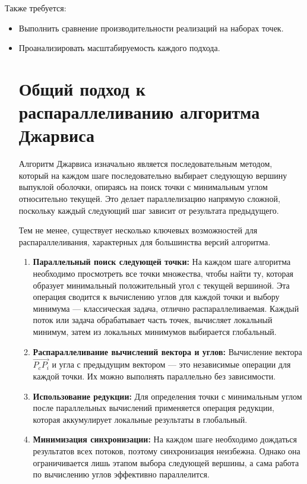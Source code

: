 \documentclass[a4paper,12pt]{article}
\begin{document}
Также требуется:
\begin{itemize}
    \item Выполнить сравнение производительности реализаций на наборах точек.
    \item Проанализировать масштабируемость каждого подхода.
\newpage
\section{Общий подход к распараллеливанию алгоритма Джарвиса}

Алгоритм Джарвиса изначально является последовательным методом, который на каждом шаге последовательно выбирает следующую вершину выпуклой оболочки, опираясь на поиск точки с минимальным углом относительно текущей. Это делает параллелизацию напрямую сложной, поскольку каждый следующий шаг зависит от результата предыдущего.

Тем не менее, существует несколько ключевых возможностей для распараллеливания, характерных для большинства версий алгоритма.

\begin{enumerate}
    \item \textbf{Параллельный поиск следующей точки:}  
    На каждом шаге алгоритма необходимо просмотреть все точки множества, чтобы найти ту, которая образует минимальный положительный угол с текущей вершиной. Эта операция сводится к вычислению углов для каждой точки и выбору минимума — классическая задача, отлично распараллеливаемая.  
    Каждый поток или задача обрабатывает часть точек, вычисляет локальный минимум, затем из локальных минимумов выбирается глобальный.

    \item \textbf{Распараллеливание вычислений вектора и углов:}  
    Вычисление вектора $\overrightarrow{P_c P_i}$ и угла с предыдущим вектором — это независимые операции для каждой точки. Их можно выполнять параллельно без зависимости.

    \item \textbf{Использование редукции:}  
    Для определения точки с минимальным углом после параллельных вычислений применяется операция редукции, которая аккумулирует локальные результаты в глобальный.

    \item \textbf{Минимизация синхронизации:}  
    На каждом шаге необходимо дождаться результатов всех потоков, поэтому синхронизация неизбежна. Однако она ограничивается лишь этапом выбора следующей вершины, а сама работа по вычислению углов эффективно параллелится.


\end{enumerate}
\end{itemize}
\end{document}
